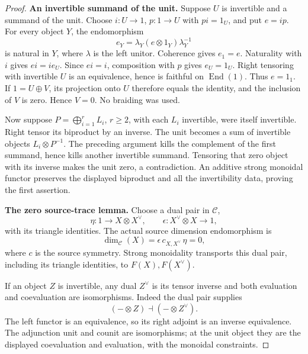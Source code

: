 \documentclass[11pt,a4paper]{article}
\theoremstyle{named}\newtheorem{finding}{Finding}[section]
\theoremstyle{definition}\newtheorem{definition}[finding]{Definition}
\theoremstyle{remark}\newtheorem{remark}[finding]{Remark}
\begin{document}
\begin{proof}
\par\smallskip\noindent\textbf{An invertible summand of the unit.}\quad
Suppose \(U\) is invertible and a summand of the unit.
Choose \(i:U\to1\), \(p:1\to U\) with \(pi=1_U\),
and put \(e=ip\).
For every object \(Y\), the endomorphism
\[
 e_Y=\lambda_Y(e\otimes1_Y)\lambda_Y^{-1}
\]
is natural in \(Y\), where \(\lambda\) is the
left unitor. Coherence gives \(e_1=e\).
Naturality with \(i\) gives \(ei=i e_U\).
Since \(ei=i\), composition with \(p\) gives
\(e_U=1_U\).
Right tensoring with invertible \(U\) is an
equivalence, hence is faithful on
\(\operatorname{End}(1)\). Thus \(e=1_1\).
If \(1=U\oplus V\), its projection onto \(U\)
therefore equals the identity, and the inclusion
of \(V\) is zero. Hence \(V=0\).
No braiding was used.

Now suppose \(P=\bigoplus_{i=1}^rL_i\), \(r\ge2\),
with each \(L_i\) invertible, were itself invertible.
Right tensor its biproduct by an inverse.
The unit becomes a sum of invertible objects
\(L_i\otimes P^{-1}\).
The preceding argument kills the complement of
the first summand, hence kills another invertible
summand. Tensoring that zero object with its inverse
makes the unit zero, a contradiction.
An additive strong monoidal functor preserves
the displayed biproduct and all the invertibility
data, proving the first assertion.

\par\smallskip\noindent\textbf{The zero source-trace lemma.}\quad
Choose a dual pair in \(\mathcal C\),
\[
 \eta:1\to X\otimes X^\vee,\qquad
 \epsilon:X^\vee\otimes X\to1,
\]
with its triangle identities. The actual
source dimension endomorphism is
\begin{equation}\label{eq:sourceZeroTraceWord}
 \dim_{\mathcal C}(X)
       =\epsilon\,c_{X,X^\vee}\,\eta=0,
\end{equation}
where \(c\) is the source symmetry.
Strong monoidality transports this dual pair,
including its triangle identities, to
\(F(X),F(X^\vee)\).

If an object \(Z\) is invertible, any dual
\(Z^\vee\) is its tensor inverse and both
evaluation and coevaluation are isomorphisms.
Indeed the dual pair supplies
\[
 (-\otimes Z)\dashv(-\otimes Z^\vee).
\]
The left functor is an equivalence, so its right
adjoint is an inverse equivalence. The adjunction
unit and counit are isomorphisms; at the unit
object they are the displayed coevaluation and
evaluation, with the monoidal constraints.


\end{proof}
\end{document}
